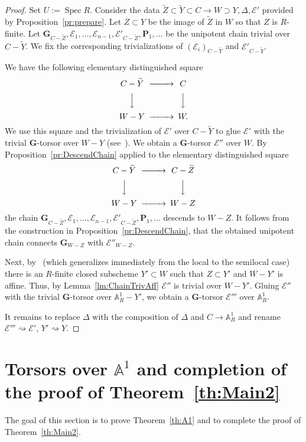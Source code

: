 \documentclass[11pt]{amsart}
\newcommand\A{\mathbb A}
\DeclareMathOperator\Spec{{Spec}}
\theoremstyle{plain}
\theoremstyle{definition}
\theoremstyle{remark}
\newcommand\cE{{\mathcal{E}}}
\newcommand\bG{{\mathbf G}}
\newcommand\bP{{\mathbf P}}
\begin{document}
\begin{proof}
Set $U:=\Spec R$. Consider the data $\widetilde Z\subset\widetilde Y\subset C\to W\supset Y, \Delta, \cE'$ provided by Proposition~\ref{pr:prepare}. Let $Z\subset Y$ be the image of $\widetilde Z$ in $W$ so that $Z$ is $R$-finite. Let $\bG_{C-\widetilde Z},\cE_1,\ldots,\cE_{n-1},\cE'_{C-\widetilde Z},\bP_1,\ldots$ be the unipotent chain trivial over $C-\widetilde Y$. We fix the corresponding trivializations of $(\cE_i)_{C-\widetilde Y}$ and $\cE'_{C-\widetilde Y}$.

We have the following elementary distinguished square
\begin{equation*}
\begin{CD}
C-\widetilde Y @>>> C\\
@VVV @VVV \\
W-Y @>>>W.
\end{CD}
\end{equation*}
We use this square and the trivialization of $\cE'$ over $C-\widetilde Y$ to glue $\cE'$ with the trivial $\bG$-torsor over $W-Y$ (see~\cite[prop.~2.6]{ColliotTeleneOjanguren}). We obtain a $\bG$-torsor $\cE''$ over $W$. By Proposition~\ref{pr:DescendChain} applied to the elementary distinguished square
\begin{equation*}
\begin{CD}
C-\widetilde Y @>>> C-\widetilde Z\\
@VVV @VVV \\
W-Y @>>>W-Z
\end{CD}
\end{equation*}
the chain $\bG_{C-\widetilde Z},\cE_1,\ldots,\cE_{n-1},\cE'_{C-\widetilde Z},\bP_1,\ldots$ descends to $W-Z$. It follows from the construction in Proposition~\ref{pr:DescendChain}, that the obtained unipotent chain connects $\bG_{W-Z}$ with $\cE''_{W-Z}$.

Next, by~\cite[Lemma~3.5(ii)]{FedorovMixedChar} (which generalizes immediately from the local to the semilocal case) there is an $R$-finite closed subscheme $Y'\subset W$ such that $Z\subset Y'$ and $W-Y'$ is affine. Thus, by Lemma~\ref{lm:ChainTrivAff} $\cE''$ is trivial over $W-Y'$. Gluing $\cE''$ with the trivial $\bG$-torsor over $\A^1_R-Y'$, we obtain a $\bG$-torsor $\cE'''$ over $\A^1_R$.

It remains to replace $\Delta$ with the composition of $\Delta$ and $C\to \A^1_R$ and rename $\cE'''\rightsquigarrow\cE'$, $Y'\rightsquigarrow Y$.
\end{proof}

\section{Torsors over \texorpdfstring{$\A^1$}{A1} and completion of the proof of Theorem~\ref{th:Main2}}\label{sect:TorsorsA1}
The goal of this section is to prove Theorem~\ref{th:A1} and to complete the proof of Theorem~\ref{th:Main2}.
\end{document}
